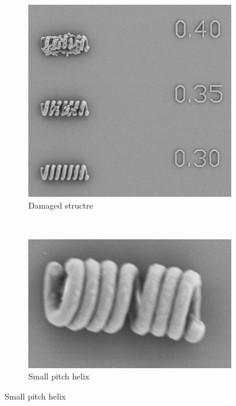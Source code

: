 \documentclass[12pt,a4paper,titlepage]{report}
\begin{document}
\begin{figure}
        \centering
        \begin{subfigure}[b]{0.40\textwidth}
                \includegraphics[width=\textwidth]{highLaser}
                \caption{Damaged structre}
                \label{Damaged structre}
        \end{subfigure}~
       \begin{subfigure}[b]{0.595\textwidth}
                \includegraphics[width=\textwidth]{smallPitchCircle}
                \caption{Small pitch helix}
                \label{smallPitchCircle}
        \end{subfigure}


\end{figure}
\end{document}
